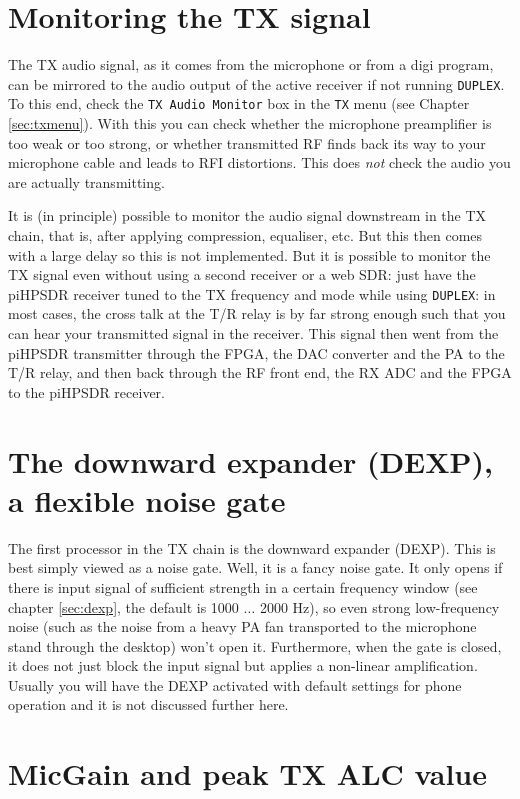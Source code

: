 \documentclass[12pt]{book}
\def\rett#1{\texttt{\color{red}#1}}
\def\bltt#1{\texttt{\color{blue}#1}}
\def\pH{pi\-HPSDR\xspace}
\begin{document}
\section{Monitoring the TX signal}

The TX audio signal, as it comes from the microphone or from
a digi program, can be mirrored to the audio output of the active receiver if not running \bltt{DUPLEX}.
To this end, check the \rett{TX Audio Monitor} box in the \bltt{TX} menu (see Chapter \ref{sec:txmenu}).
With this you can check whether the microphone preamplifier is too weak or too strong, or whether
transmitted RF finds back its way to your microphone cable and leads to RFI distortions. This does
\textit{not} check the audio you are actually transmitting.

It is (in principle) possible to monitor the audio signal downstream in the TX chain, that is, after
applying compression, equaliser, etc. But this then comes with a large delay so this is not implemented.
But it is possible to monitor the TX signal even without using a second receiver or a web SDR:
just have the \pH receiver
tuned to the TX frequency and mode while using \bltt{DUPLEX}: in most cases, the cross talk at the T/R relay is
by far strong enough such that you can hear your transmitted signal in the receiver. This signal then went from
the \pH transmitter through the FPGA, the DAC converter and the PA to the T/R relay,
and then back through the RF front end,
the RX ADC and the FPGA to the \pH receiver.

\section{The downward expander (DEXP), a flexible noise gate}

The first processor in the TX chain is the downward expander (DEXP). This is best simply viewed as
a noise gate. Well, it is a fancy noise gate. It only opens if there is input signal of sufficient
strength in a certain frequency window (see chapter \ref{sec:dexp}, the default is 1000 $\ldots$ 2000 Hz),
so even strong low-frequency noise (such as the noise from a heavy PA fan transported to the microphone stand
through the desktop) won't open it. Furthermore, when the gate is closed, it does not just block the input
signal but applies a non-linear amplification. Usually you will have the DEXP activated with default
settings for phone operation and it is not discussed further here.

\section{MicGain and peak TX ALC value}
\end{document}
